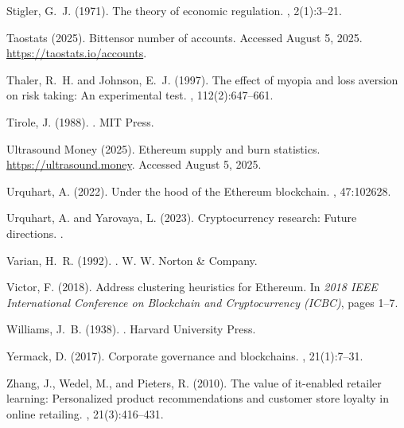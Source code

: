 \documentclass[12pt]{article}
\begin{document}
\begin{thebibliography}{}
Stigler, G.~J. (1971).
\newblock The theory of economic regulation.
,
  2(1):3--21.

{Taostats} (2025).
\newblock Bittensor number of accounts.
\newblock Accessed August 5, 2025.
\newblock \url{https://taostats.io/accounts}.

Thaler, R.~H. and Johnson, E.~J. (1997).
\newblock The effect of myopia and loss aversion on risk taking: An
  experimental test.
, 112(2):647--661.

Tirole, J. (1988).
.
\newblock MIT Press.

{Ultrasound Money} (2025).
\newblock Ethereum supply and burn statistics.
\newblock \url{https://ultrasound.money}.
\newblock Accessed August 5, 2025.

Urquhart, A. (2022).
\newblock Under the hood of the Ethereum blockchain.
, 47:102628.

Urquhart, A. and Yarovaya, L. (2023).
\newblock Cryptocurrency research: Future directions.
.

Varian, H.~R. (1992).
.
\newblock W. W. Norton \& Company.

Victor, F. (2018).
\newblock Address clustering heuristics for Ethereum.
\newblock In {\em 2018 IEEE International Conference on Blockchain and
  Cryptocurrency (ICBC)}, pages 1--7.

Williams, J.~B. (1938).
.
\newblock Harvard University Press.

Yermack, D. (2017).
\newblock Corporate governance and blockchains.
, 21(1):7--31.

Zhang, J., Wedel, M., and Pieters, R. (2010).
\newblock The value of it-enabled retailer learning: Personalized product
  recommendations and customer store loyalty in online retailing.
, 21(3):416--431.

\end{thebibliography}
\end{document}
